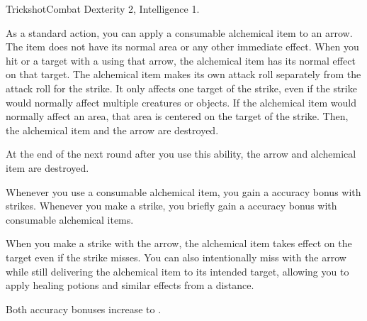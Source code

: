   \begin{feat}{Trickshot}{Combat}
    \featpre Dexterity 2, Intelligence 1.

     As a standard action, you can apply a consumable alchemical item to an arrow.
    The item does not have its normal area or any other immediate effect.
    When you hit or  a target with a  using that arrow, the alchemical item has its normal effect on that target.
    The alchemical item makes its own attack roll separately from the attack roll for the strike.
    It only affects one target of the strike, even if the strike would normally affect multiple creatures or objects.
    If the alchemical item would normally affect an area, that area is centered on the target of the strike.
    Then, the alchemical item and the arrow are destroyed.

    At the end of the next round after you use this ability, the arrow and alchemical item are destroyed.

     Whenever you use a consumable alchemical item, you  gain a  accuracy bonus with strikes.
    Whenever you make a strike, you briefly gain a  accuracy bonus with consumable alchemical items.

     When you make a strike with the arrow, the alchemical item takes effect on the target even if the strike misses.
    You can also intentionally miss with the arrow while still delivering the alchemical item to its intended target, allowing you to apply healing potions and similar effects from a distance.

     Both accuracy bonuses increase to .
  \end{feat}

